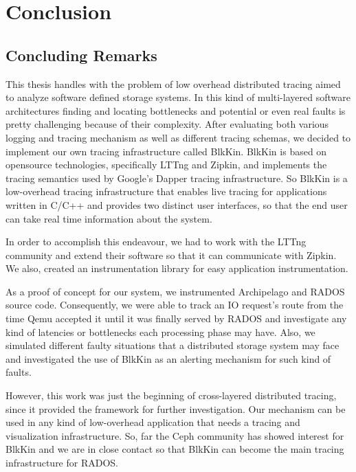 \chapter{Conclusion}\label{ch:conclusion}

\section{Concluding Remarks}

This thesis handles with the problem of low overhead distributed tracing aimed
to analyze software defined storage systems. In this kind of multi-layered
software architectures finding and locating bottlenecks and potential or even
real faults is pretty challenging because of their complexity. After evaluating
both various logging and tracing mechanism as well as different tracing
schemas, we decided to implement our own tracing infrastructure called BlkKin.
BlkKin is based on opensource technologies, specifically LTTng and Zipkin, and
implements the tracing semantics used by Google's Dapper tracing
infrastructure. So BlkKin is a low-overhead tracing infrastructure that enables
live tracing for applications written in C/C++ and provides two distinct user
interfaces, so that the end user can take real time information about the
system.

In order to accomplish this endeavour, we had to work with the LTTng community
and extend their software so that it can communicate with Zipkin. We also,
created an instrumentation library for easy application instrumentation.

As a proof of concept for our system, we instrumented Archipelago and RADOS
source code. Consequently, we were able to track an IO request's route from the
time Qemu accepted it until it was finally served by RADOS and investigate any
kind of latencies or bottlenecks each processing phase may have. Also, we
simulated different faulty situations that a distributed storage system may face
and investigated the use of BlkKin as an alerting mechanism for such kind of
faults.

However, this work was just the beginning of cross-layered distributed tracing,
since it provided the framework for further investigation. Our mechanism can be
used in any kind of low-overhead application that needs a tracing and
visualization infrastructure. So, far the Ceph community has showed interest
for BlkKin and we are in close contact so that BlkKin can become the main
tracing infrastructure for RADOS. 
 
